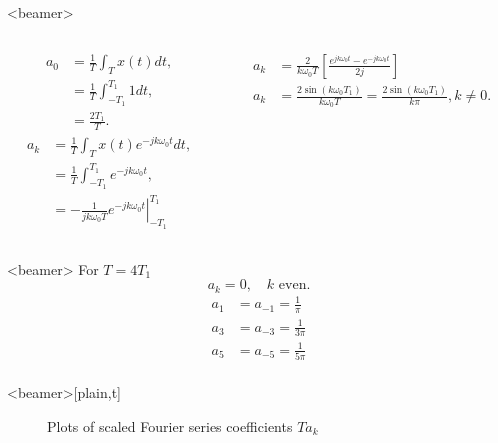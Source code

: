\begin{frame}<beamer>
    \begin{columns}
      \begin{column}{0.5\textwidth}
            \begin{equation*}
                \begin{split}
                   a_0 &= \frac{1}{T} \int_{T}x(t)dt,\\
                   &=  \frac{1}{T} \int_{-T_1}^{T_1}1dt,\\
                   &= \frac{2T_1}{T}.
                \end{split}
            \end{equation*}
            \pause
            \begin{equation*}
                \begin{split}
                   a_k &= \frac{1}{T} \int_{T}x(t)e^{-jk\omega_0 t}dt,\\
                   &=  \frac{1}{T} \int_{-T_1}^{T_1}e^{-jk\omega_0 t},\\
                   &= -\left. \frac{1}{jk\omega_0 T}e^{-jk\omega_0 t}\right|^{T_1}_{-T_1}
                \end{split}
            \end{equation*}
      \end{column}
      \begin{column}{0.5\textwidth}
            \pause
            \begin{equation*}
                \begin{split}
                   a_k &= \frac{2}{k\omega_0 T}\left[\frac{e^{jk\omega_0 t} - e^{-jk\omega_0 t}}{2j}\right]\\
                   a_k &= \frac{2\sin(k\omega_0 T_1)}{k\omega_0 T} = \frac{2\sin(k\omega_0 T_1)}{k\pi}, k \neq 0.
                \end{split}
            \end{equation*}
      \end{column}
    \end{columns}
\end{frame}

\begin{frame}<beamer>
    For $T=4T_1$
    \begin{equation*}
        a_k = 0, \quad k \text{ even}.
    \end{equation*}
    \begin{align*}
        a_1 &= a_{-1} = \frac{1}{\pi}\\
        a_3 &= a_{-3} = \frac{1}{3\pi}\\
        a_5 &= a_{-5} = \frac{1}{5\pi}\\
    \end{align*}
\end{frame} 


\begin{frame}<beamer>[plain,t]
    \begin{figure}
      \centering
      
      \caption{Plots of scaled Fourier series coefficients $Ta_k$}\label{fi:example02_periodic_square_fs}
    \end{figure}
\end{frame}
